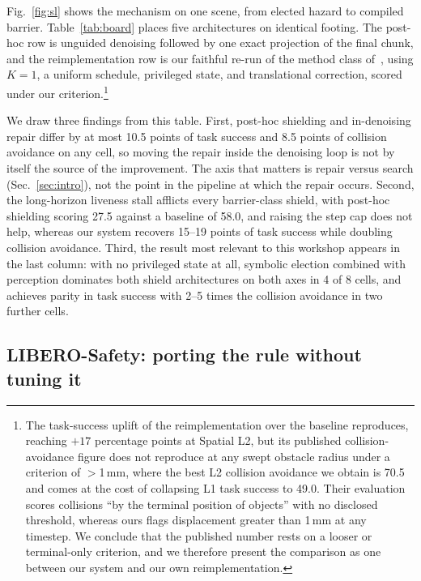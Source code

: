 \documentclass[conference]{IEEEtran}
\begin{document}
Fig.~\ref{fig:sl} shows the mechanism on one scene, from elected hazard to compiled barrier. Table~\ref{tab:board} places five architectures on identical footing. The post-hoc row is unguided denoising followed by one exact projection of the final chunk, and the reimplementation row is our faithful re-run of the method class of~\cite{sota2607}, using $K{=}1$, a uniform schedule, privileged state, and translational correction, scored under our criterion.\footnote{The task-success uplift of the reimplementation over the baseline reproduces, reaching $+17$ percentage points at Spatial L2, but its published collision-avoidance figure does not reproduce at any swept obstacle radius under a criterion of $>$1\,mm, where the best L2 collision avoidance we obtain is 70.5 and comes at the cost of collapsing L1 task success to 49.0. Their evaluation scores collisions ``by the terminal position of objects'' with no disclosed threshold, whereas ours flags displacement greater than 1\,mm at any timestep. We conclude that the published number rests on a looser or terminal-only criterion, and we therefore present the comparison as one between our system and our own reimplementation.}

We draw three findings from this table. First, post-hoc shielding and in-denoising repair differ by at most 10.5 points of task success and 8.5 points of collision avoidance on any cell, so moving the repair inside the denoising loop is not by itself the source of the improvement. The axis that matters is repair versus search (Sec.~\ref{sec:intro}), not the point in the pipeline at which the repair occurs. Second, the long-horizon liveness stall afflicts every barrier-class shield, with post-hoc shielding scoring 27.5 against a baseline of 58.0, and raising the step cap does not help, whereas our system recovers 15--19 points of task success while doubling collision avoidance. Third, the result most relevant to this workshop appears in the last column: with no privileged state at all, symbolic election combined with perception dominates both shield architectures on both axes in 4 of 8 cells, and achieves parity in task success with 2--5 times the collision avoidance in two further cells.

\subsection{LIBERO-Safety: porting the rule without tuning it}
\label{sec:ls}
\end{document}
